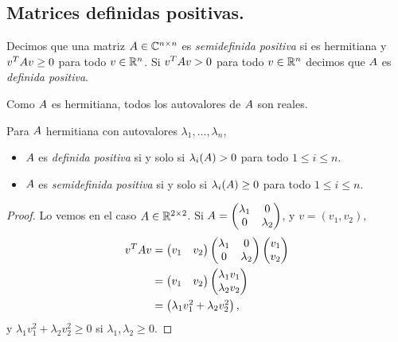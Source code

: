 \subsection{Matrices definidas positivas. }


Decimos que una matriz $\Ab \in \C^{n \times n}$ es \emph{semidefinida positiva} si es hermitiana y 
    $\vb^T \Ab \vb \ge 0$ para todo $\vb \in \R^n$. Si $\vb^T \Ab \vb > 0$ para todo $\vb \in \R^n$ decimos que $\Ab$ es \emph{definida positiva}.

Como $\Ab$ es hermitiana, todos los autovalores de $\Ab$ son reales. 

\begin{prop} Para $\Ab$ hermitiana con autovalores $\lambda_1, \dots, \lambda_n$, 
\begin{itemize}
\item   $\Ab$ es \emph{definida positiva} si y solo si $\lambda_i(\Ab) > 0$ para todo
    $1 \le i \le n$.
\item  $\Ab$ es \emph{semidefinida positiva} si y solo si $\lambda_i(\Ab) \ge 0$ para todo
    $1 \le i \le n$.
\end{itemize}
\end{prop}

\begin{proof}

Lo vemos en el caso $\Ab \in \R^{2 \times 2}$. 
Si $\Ab = \begin{pmatrix} \lambda_1 & 0 \\ 0 & \lambda_2 \end{pmatrix}$, y
$v = (v_1, v_2)$,
$$ \begin{aligned} \vb^T \Ab \vb &=
\begin{pmatrix} v_1 & v_2 \end{pmatrix} \begin{pmatrix} \lambda_1 & 0 \\ 0 & \lambda_2 \end{pmatrix} \begin{pmatrix} v_1 \\ v_2 \end{pmatrix} \\
&= \begin{pmatrix} v_1 & v_2 \end{pmatrix} \begin{pmatrix} \lambda_1 v_1 \\ \lambda_2 v_2\end{pmatrix} \\
&= \begin{pmatrix} \lambda_1 v_1^2 + \lambda_2 v_2^2 \end{pmatrix},
\end{aligned}$$
y $\lambda_1 v_1^2 + \lambda_2 v_2^2 \ge 0$ si
$\lambda_1, \lambda_2 \ge 0$.

\end{proof}

